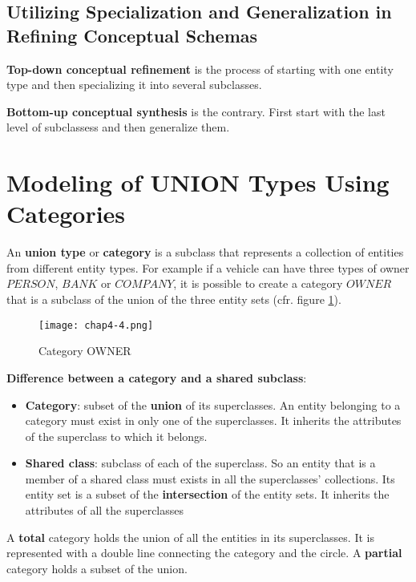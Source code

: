 \subsection{Utilizing Specialization and Generalization in Refining Conceptual Schemas}

\textbf{Top-down conceptual refinement} is the process of starting with one entity type and then specializing it into several subclasses.

\textbf{Bottom-up conceptual synthesis} is the contrary. First start with the last level of subclassess and then generalize them. 

\section{Modeling of UNION Types Using Categories}

An \textbf{union type} or \textbf{category} is a subclass that represents a collection of entities from different entity types. For example if a vehicle can have three types of owner $PERSON$, $BANK$ or $COMPANY$, it is possible to create a category $OWNER$ that is a subclass of the union of the three entity sets (cfr. figure \ref{fig:category}). \\

\begin{figure}[!h]
    \centering
    \texttt{[image: chap4-4.png]}
    \caption{Category OWNER}
    \label{fig:category}
\end{figure}

\textbf{Difference between a category and a shared subclass}:\\

\begin{itemize}
    \item \textbf{Category}: subset of the \textbf{union} of its superclasses. An entity belonging to a category must exist in only one of the superclasses. It inherits the attributes of the superclass to which it belongs.
    \item \textbf{Shared class}: subclass of each of the superclass. So an entity that is a member of a shared class must exists in all the superclasses' collections. Its entity set is a subset of the \textbf{intersection} of the entity sets. It inherits the attributes of all the superclasses
\end{itemize}

A \textbf{total} category holds the union of all the entities in its superclasses. It is represented with a double line connecting the category and the circle. A \textbf{partial} category holds a subset of the union.

